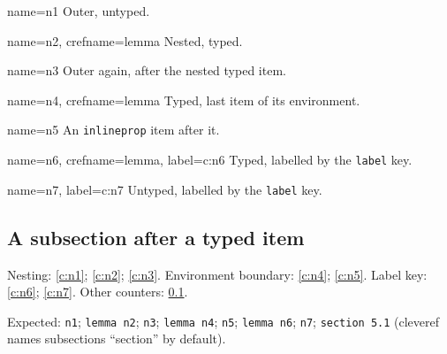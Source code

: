 \documentclass{article}
\begin{document}
\begin{prop}
  \item[name=n1] Outer, untyped. \label{c:n1}
  \begin{prop}
    \item[name=n2, crefname=lemma] Nested, typed. \label{c:n2}
  \end{prop}
  \item[name=n3] Outer again, after the nested typed item. \label{c:n3}
\end{prop}

\begin{prop}
  \item[name=n4, crefname=lemma] Typed, last item of its environment.
    \label{c:n4}
\end{prop}
\begin{inlineprop}
  \item[name=n5] An \texttt{inlineprop} item after it. \label{c:n5}
\end{inlineprop}

\begin{prop}
  \item[name=n6, crefname=lemma, label=c:n6] Typed, labelled by the
    \texttt{label} key.
  \item[name=n7, label=c:n7] Untyped, labelled by the \texttt{label} key.
\end{prop}

\subsection{A subsection after a typed item} \label{c:n8}

Nesting: \cref{c:n1}; \cref{c:n2}; \cref{c:n3}.
Environment boundary: \cref{c:n4}; \cref{c:n5}.
Label key: \cref{c:n6}; \cref{c:n7}.
Other counters: \cref{c:n8}.

Expected: \texttt{n1}; \texttt{lemma n2}; \texttt{n3}; \texttt{lemma n4};
\texttt{n5}; \texttt{lemma n6}; \texttt{n7}; \texttt{section 5.1}
(cleveref names subsections ``section'' by default).
\end{document}
